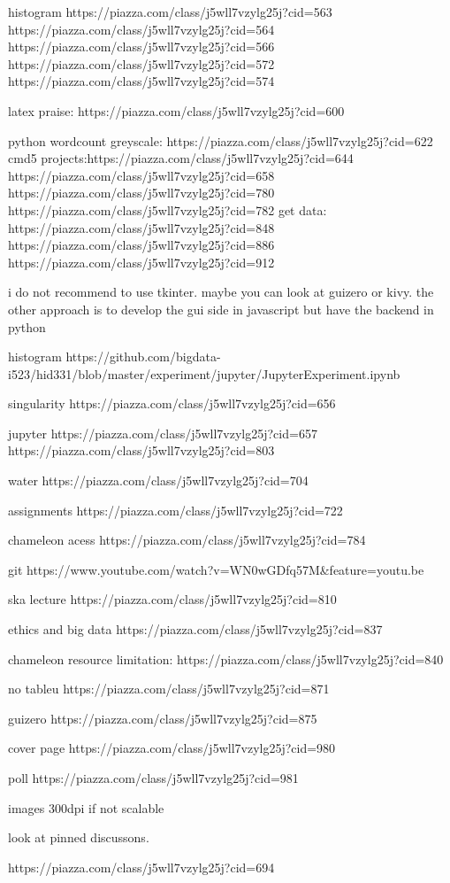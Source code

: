  histogram
https://piazza.com/class/j5wll7vzylg25j?cid=563
https://piazza.com/class/j5wll7vzylg25j?cid=564
https://piazza.com/class/j5wll7vzylg25j?cid=566
https://piazza.com/class/j5wll7vzylg25j?cid=572
https://piazza.com/class/j5wll7vzylg25j?cid=574

latex praise:
https://piazza.com/class/j5wll7vzylg25j?cid=600

python
wordcount
greyscale: https://piazza.com/class/j5wll7vzylg25j?cid=622
cmd5 projects:https://piazza.com/class/j5wll7vzylg25j?cid=644
https://piazza.com/class/j5wll7vzylg25j?cid=658
https://piazza.com/class/j5wll7vzylg25j?cid=780
https://piazza.com/class/j5wll7vzylg25j?cid=782
get data: https://piazza.com/class/j5wll7vzylg25j?cid=848
https://piazza.com/class/j5wll7vzylg25j?cid=886
https://piazza.com/class/j5wll7vzylg25j?cid=912

i do not recommend to use tkinter. maybe you can look at guizero or kivy. the other approach is to develop the gui side in javascript but have the backend in python

histogram
https://github.com/bigdata-i523/hid331/blob/master/experiment/jupyter/JupyterExperiment.ipynb

singularity
https://piazza.com/class/j5wll7vzylg25j?cid=656

jupyter
https://piazza.com/class/j5wll7vzylg25j?cid=657
https://piazza.com/class/j5wll7vzylg25j?cid=803

water
https://piazza.com/class/j5wll7vzylg25j?cid=704

assignments
https://piazza.com/class/j5wll7vzylg25j?cid=722

chameleon acess
https://piazza.com/class/j5wll7vzylg25j?cid=784

git
https://www.youtube.com/watch?v=WN0wGDfq57M&feature=youtu.be

ska lecture
https://piazza.com/class/j5wll7vzylg25j?cid=810

ethics and big data
https://piazza.com/class/j5wll7vzylg25j?cid=837

chameleon
resource limitation: https://piazza.com/class/j5wll7vzylg25j?cid=840

no tableu
https://piazza.com/class/j5wll7vzylg25j?cid=871

guizero
https://piazza.com/class/j5wll7vzylg25j?cid=875

cover page
https://piazza.com/class/j5wll7vzylg25j?cid=980

poll
https://piazza.com/class/j5wll7vzylg25j?cid=981

images 300dpi if not scalable

look at pinned discussons.

https://piazza.com/class/j5wll7vzylg25j?cid=694